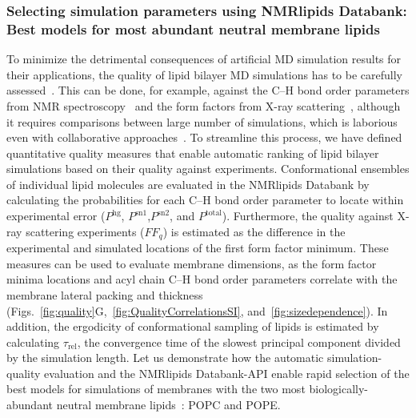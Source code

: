 \documentclass[fleqn,10pt]{wlscirep}
\begin{document}
\subsubsection{Selecting simulation parameters using NMRlipids Databank: Best models for most abundant neutral membrane lipids}
%
%
To minimize the detrimental consequences of artificial MD simulation results for their applications, the quality of lipid bilayer MD simulations has to be carefully assessed~\cite{antila22b}. This can be done, for example, against the C--H bond order parameters from NMR spectroscopy~\cite{bacle21,Wur23} and the form factors from X-ray scattering~\cite{ollila16}, although it requires comparisons between large number of simulations, which is laborious even with collaborative approaches~\cite{botan15,catte16,antila19,bacle21}. To streamline this process, we have defined quantitative quality measures that enable automatic ranking of lipid bilayer simulations based on their quality against experiments. Conformational ensembles of individual lipid molecules are evaluated in the NMRlipids Databank by calculating the probabilities for each C--H bond order parameter to locate within experimental error ($P^{\mathrm{hg}}$, $P^{\mathrm{sn1}}$,$P^{\mathrm{sn2}}$, and $P^{\mathrm{total}}$). Furthermore, the quality against X-ray scattering experiments ($FF_q$) is estimated as the difference in the experimental and simulated locations of the first form factor minimum. These measures can be used to evaluate membrane dimensions, as the form factor minima locations and acyl chain C--H bond order parameters correlate with the membrane lateral packing and thickness (Figs.~\ref{fig:quality}G,~\ref{fig:QualityCorrelationsSI}, and~\ref{fig:sizedependence}). In addition, the ergodicity of conformational sampling of lipids is estimated by calculating $\tau_\mathrm{rel}$, the convergence time of the slowest principal component divided by the simulation length. Let us demonstrate how the automatic simulation-quality evaluation and the NMRlipids Databank-API enable rapid selection of the best models for simulations of membranes with the two most biologically-abundant neutral membrane lipids~\cite{vanmeer08}: POPC and POPE.
\end{document}

